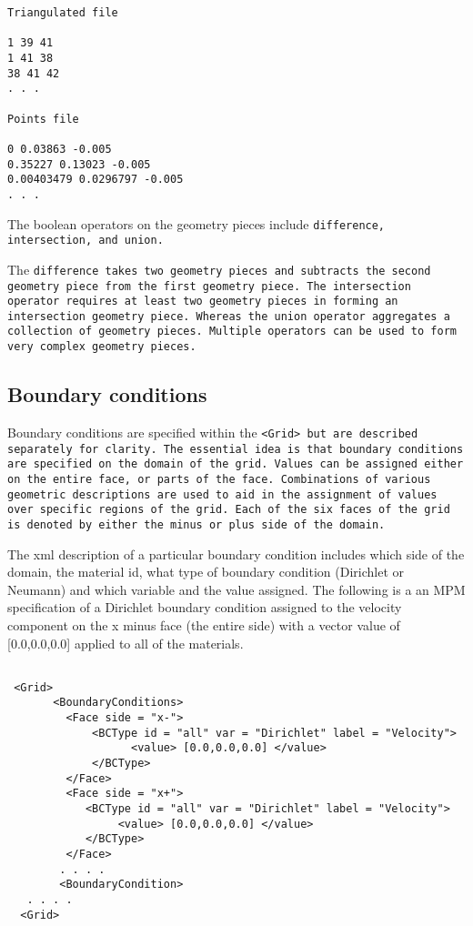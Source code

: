 \begin{Verbatim}[fontsize=\footnotesize]
Triangulated file

1 39 41
1 41 38
38 41 42
. . .

Points file

0 0.03863 -0.005
0.35227 0.13023 -0.005
0.00403479 0.0296797 -0.005
. . .

\end{Verbatim}

The boolean operators on the geometry pieces include \tt difference, intersection, \normalfont and \tt union.\normalfont 

The \tt difference  \normalfont takes two geometry pieces and subtracts the second
geometry piece from the first geometry piece.  The \tt intersection \normalfont
operator requires at least two geometry pieces in forming an
intersection geometry piece.  Whereas the \tt union \normalfont operator aggregates a
collection of geometry pieces.  Multiple operators can be used to form
very complex geometry pieces.


\subsection{Boundary conditions}

Boundary conditions are specified within the \tt <Grid> \normalfont
but are described separately for clarity.  The essential idea is that
boundary conditions are specified on the domain of the grid.  Values
can be assigned either on the entire face, or parts of the face.
Combinations of various geometric descriptions are used to aid in the
assignment of values over specific regions of the grid.  Each of the
six faces of the grid is denoted by either the minus or plus side of
the domain.

The xml description of a particular boundary condition includes which
side of the domain, the material id, what type of boundary condition
(Dirichlet or Neumann) and which variable and the value assigned.  The
following is a an MPM specification of a Dirichlet boundary condition
assigned to the velocity component on the x minus face (the entire
side) with a vector value of [0.0,0.0,0.0] applied to all of the materials.

\begin{Verbatim}[fontsize=\footnotesize]

 <Grid>
       <BoundaryConditions>
         <Face side = "x-">
             <BCType id = "all" var = "Dirichlet" label = "Velocity">
                   <value> [0.0,0.0,0.0] </value>
             </BCType>
         </Face>
         <Face side = "x+">
            <BCType id = "all" var = "Dirichlet" label = "Velocity">
                 <value> [0.0,0.0,0.0] </value>
            </BCType>
         </Face>
        . . . .
        <BoundaryCondition>
   . . . .
  <Grid>

\end{Verbatim}

